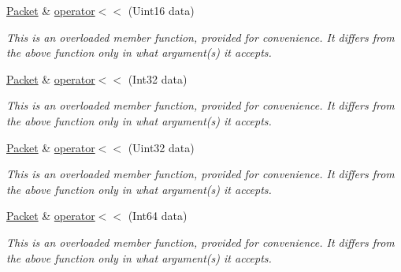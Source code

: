 \begin{DoxyCompactItemize}
\mbox{\label{classsf_1_1_packet_a557cbc0289135209248aca1aa2117c40}} 
\mbox{\hyperlink{classsf_1_1_packet}{Packet}} \& \mbox{\hyperlink{classsf_1_1_packet_a557cbc0289135209248aca1aa2117c40}{operator$<$$<$}} (Uint16 data)
\begin{DoxyCompactList}\small\item\em This is an overloaded member function, provided for convenience. It differs from the above function only in what argument(s) it accepts. \end{DoxyCompactList}\item 
\mbox{\label{classsf_1_1_packet_ad60c9ad6e4e92399e2a36938ad122d05}} 
\mbox{\hyperlink{classsf_1_1_packet}{Packet}} \& \mbox{\hyperlink{classsf_1_1_packet_ad60c9ad6e4e92399e2a36938ad122d05}{operator$<$$<$}} (Int32 data)
\begin{DoxyCompactList}\small\item\em This is an overloaded member function, provided for convenience. It differs from the above function only in what argument(s) it accepts. \end{DoxyCompactList}\item 
\mbox{\label{classsf_1_1_packet_afb113b73749efb662a75deb98257ad34}} 
\mbox{\hyperlink{classsf_1_1_packet}{Packet}} \& \mbox{\hyperlink{classsf_1_1_packet_afb113b73749efb662a75deb98257ad34}{operator$<$$<$}} (Uint32 data)
\begin{DoxyCompactList}\small\item\em This is an overloaded member function, provided for convenience. It differs from the above function only in what argument(s) it accepts. \end{DoxyCompactList}\item 
\mbox{\label{classsf_1_1_packet_abba83b3c98af99190886d20d7595a94c}} 
\mbox{\hyperlink{classsf_1_1_packet}{Packet}} \& \mbox{\hyperlink{classsf_1_1_packet_abba83b3c98af99190886d20d7595a94c}{operator$<$$<$}} (Int64 data)
\begin{DoxyCompactList}\small\item\em This is an overloaded member function, provided for convenience. It differs from the above function only in what argument(s) it accepts. \end{DoxyCompactList}\item 
\mbox{\label{classsf_1_1_packet_a60df5a35a3fb6416131d77232737c68b}} 

\end{DoxyCompactItemize}
